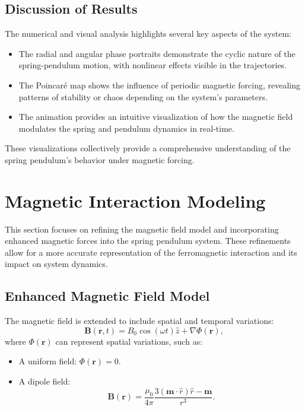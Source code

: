 \documentclass[12pt]{article}
\begin{document}
\subsection{Discussion of Results}
The numerical and visual analysis highlights several key aspects of the system:
\begin{itemize}
    \item The radial and angular phase portraits demonstrate the cyclic nature of the spring-pendulum motion, with nonlinear effects visible in the trajectories.
    \item The Poincaré map shows the influence of periodic magnetic forcing, revealing patterns of stability or chaos depending on the system's parameters.
    \item The animation provides an intuitive visualization of how the magnetic field modulates the spring and pendulum dynamics in real-time.
\end{itemize}
These visualizations collectively provide a comprehensive understanding of the spring pendulum's behavior under magnetic forcing.

\section{Magnetic Interaction Modeling}

This section focuses on refining the magnetic field model and incorporating enhanced magnetic forces into the spring pendulum system. These refinements allow for a more accurate representation of the ferromagnetic interaction and its impact on system dynamics.

\subsection{Enhanced Magnetic Field Model}
The magnetic field is extended to include spatial and temporal variations:
\[
\mathbf{B}(\mathbf{r}, t) = B_0 \cos(\omega t) \hat{z} + \nabla \Phi(\mathbf{r}),
\]
where \( \Phi(\mathbf{r}) \) can represent spatial variations, such as:
\begin{itemize}
    \item A uniform field: \( \Phi(\mathbf{r}) = 0 \).
    \item A dipole field:
    \[
    \mathbf{B}(\mathbf{r}) = \frac{\mu_0}{4\pi} \frac{3(\mathbf{m} \cdot \hat{r}) \hat{r} - \mathbf{m}}{r^3}.
    \]
\end{itemize}
\end{document}

